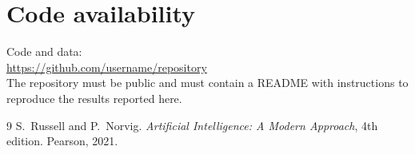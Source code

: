 \documentclass[11pt,a4paper,twocolumn]{article}
\newcommand{\githuburl}{https://github.com/username/repository}
\begin{document}
\section*{Code availability}
\noindent Code and data:\\
\url{\githuburl}\\
The repository must be public and must contain a README with instructions to reproduce the
results reported here.

\begin{thebibliography}{9}
\small
{}
S.~Russell and P.~Norvig.
\newblock \emph{Artificial Intelligence: A Modern Approach}, 4th edition.
\newblock Pearson, 2021.
\end{thebibliography}
\end{document}
